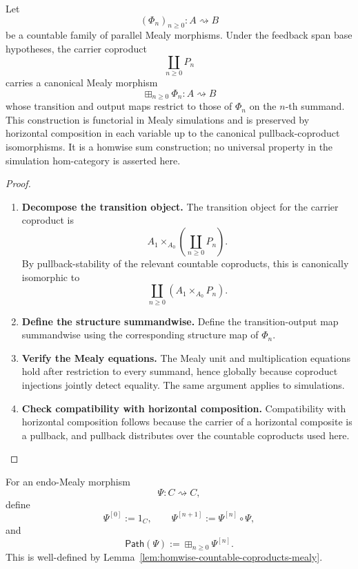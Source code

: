 \begin{lemma}
\label{lem:homwise-countable-coproducts-mealy}
Let
\[
  (\Phi_n)_{n\geq 0}:A\rightsquigarrow B
\]
be a countable family of parallel Mealy morphisms. Under the feedback span
base hypotheses, the carrier coproduct
\[
  \coprod_{n\geq 0}P_n
\]
carries a canonical Mealy morphism
\[
  \boxplus_{n\geq 0}\Phi_n:A\rightsquigarrow B
\]
whose transition and output maps restrict to those of \(\Phi_n\) on the
\(n\)-th summand. This construction is functorial in Mealy simulations and is
preserved by horizontal composition in each variable up to the canonical
pullback-coproduct isomorphisms. It is a homwise sum construction; no
universal property in the simulation hom-category is asserted here.
\end{lemma}

\begin{proof}
\begin{enumerate}
  \item \textbf{Decompose the transition object.}
  The transition object for the carrier coproduct is
  \[
    A_1\times_{A_0}\left(\coprod_{n\geq 0}P_n\right).
  \]
  By pullback-stability of the relevant countable coproducts, this is
  canonically isomorphic to
  \[
    \coprod_{n\geq 0}(A_1\times_{A_0}P_n).
  \]

  \item \textbf{Define the structure summandwise.}
  Define the transition-output map summandwise using the corresponding
  structure map of \(\Phi_n\).

  \item \textbf{Verify the Mealy equations.}
  The Mealy unit and multiplication equations hold after restriction to every
  summand, hence globally because coproduct injections jointly detect
  equality. The same argument applies to simulations.

  \item \textbf{Check compatibility with horizontal composition.}
  Compatibility with horizontal composition follows because the carrier of a
  horizontal composite is a pullback, and pullback distributes over the
  countable coproducts used here.
\end{enumerate}
\end{proof}

For an endo-Mealy morphism
\[
  \Psi:C\rightsquigarrow C,
\]
define
\[
  \Psi^{[0]}:=1_C,
  \qquad
  \Psi^{[n+1]}:=\Psi^{[n]}\circ\Psi,
\]
and
\[
  \mathsf{Path}(\Psi):=\boxplus_{n\geq 0}\Psi^{[n]}.
\]
This is well-defined by
Lemma~\ref{lem:homwise-countable-coproducts-mealy}.

